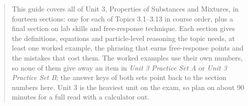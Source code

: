 \documentclass[11pt]{article}
\begin{document}
\titleblock
\begin{abstract}
This guide covers all of Unit 3, Properties of Substances and Mixtures, in fourteen sections: one for each of Topics 3.1--3.13 in course order, plus a final section on lab skills and free-response technique. Each section gives the definitions, equations and particle-level reasoning the topic needs, at least one worked example, the phrasing that earns free-response points and the mistakes that cost them. The worked examples use their own numbers, so none of them give away an item in \emph{Unit 3 Practice Set A} or \emph{Unit 3 Practice Set B}; the answer keys of both sets point back to the section numbers here. Unit 3 is the heaviest unit on the exam, so plan on about 90 minutes for a full read with a calculator out.
\end{abstract}
\end{document}
